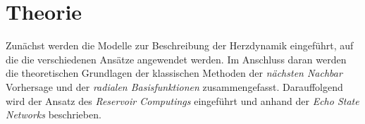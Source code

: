 \chapter{Theorie}
\label{ch:theory}
Zunächst werden die Modelle zur Beschreibung der Herzdynamik eingeführt, auf die die verschiedenen Ansätze angewendet werden. Im Anschluss daran werden die theoretischen Grundlagen der klassischen Methoden der \textit{nächsten Nachbar} Vorhersage und der \textit{radialen Basisfunktionen} zusammengefasst. Darauffolgend wird der Ansatz des \textit{Reservoir Computings} eingeführt und anhand der \textit{Echo State Networks} beschrieben.




